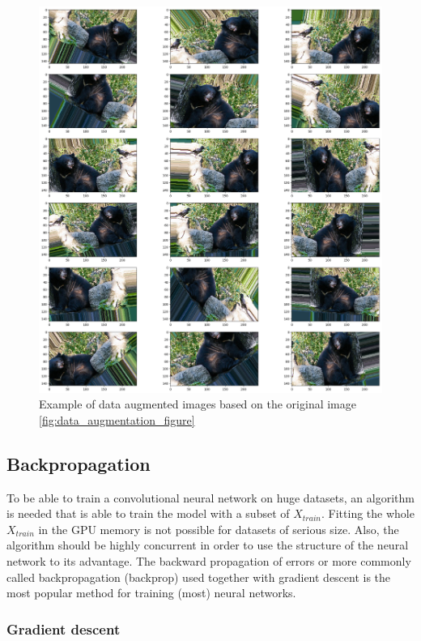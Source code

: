 \documentclass[times, utf8, diplomski]{fer}
\begin{document}
\begin{figure}
  \includegraphics[scale=0.35]{figures/da1.png}
  \centering
  \caption{Example of data augmented images based on the original image \ref{fig:data_augmentation_figure}}
  \label{fig:data_augmentation}
\end{figure}

\subsection{Backpropagation} \label{se:backprop}

To be able to train a convolutional neural network on huge datasets, an algorithm is needed that is able to train the model with a subset of $X_{train}$. Fitting the whole $X_{train}$ in the GPU memory is not possible for datasets of serious size. Also, the algorithm should be highly concurrent in order to use the structure of the neural network to its advantage. The backward propagation of errors or more commonly called backpropagation (backprop) used together with gradient descent is the most popular method for training (most) neural networks.

\subsubsection{Gradient descent}
\end{document}
